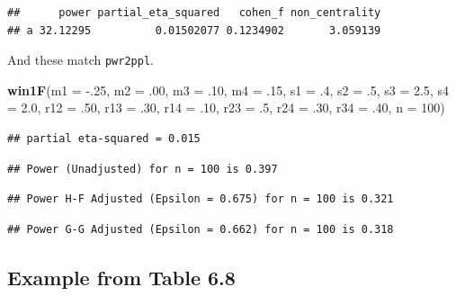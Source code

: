 \documentclass[
]{book}
\newenvironment{Shaded}{\begin{snugshade}}{\end{snugshade}}
\newcommand{\DataTypeTok}[1]{\textcolor[rgb]{0.13,0.29,0.53}{#1}}
\newcommand{\DecValTok}[1]{\textcolor[rgb]{0.00,0.00,0.81}{#1}}
\newcommand{\FloatTok}[1]{\textcolor[rgb]{0.00,0.00,0.81}{#1}}
\newcommand{\KeywordTok}[1]{\textcolor[rgb]{0.13,0.29,0.53}{\textbf{#1}}}
\newcommand{\NormalTok}[1]{#1}
\begin{document}
\begin{verbatim}
##      power partial_eta_squared   cohen_f non_centrality
## a 32.12295          0.01502077 0.1234902       3.059139
\end{verbatim}

And these match \texttt{pwr2ppl}.

\begin{Shaded}
\begin{Highlighting}[]
\KeywordTok{win1F}\NormalTok{(}\DataTypeTok{m1 =} \FloatTok{-.25}\NormalTok{, }\DataTypeTok{m2 =} \FloatTok{.00}\NormalTok{, }\DataTypeTok{m3 =} \FloatTok{.10}\NormalTok{, }\DataTypeTok{m4 =} \FloatTok{.15}\NormalTok{,}
      \DataTypeTok{s1 =} \FloatTok{.4}\NormalTok{, }\DataTypeTok{s2 =} \FloatTok{.5}\NormalTok{, }\DataTypeTok{s3 =} \FloatTok{2.5}\NormalTok{, }\DataTypeTok{s4 =} \FloatTok{2.0}\NormalTok{,}
      \DataTypeTok{r12 =} \FloatTok{.50}\NormalTok{, }\DataTypeTok{r13 =} \FloatTok{.30}\NormalTok{, }\DataTypeTok{r14 =} \FloatTok{.10}\NormalTok{,}
      \DataTypeTok{r23 =} \FloatTok{.5}\NormalTok{, }\DataTypeTok{r24 =} \FloatTok{.30}\NormalTok{, }\DataTypeTok{r34 =} \FloatTok{.40}\NormalTok{,}
      \DataTypeTok{n =} \DecValTok{100}\NormalTok{)}
\end{Highlighting}
\end{Shaded}

\begin{verbatim}
## partial eta-squared = 0.015
\end{verbatim}

\begin{verbatim}
## Power (Unadjusted) for n = 100 is 0.397
\end{verbatim}

\begin{verbatim}
## Power H-F Adjusted (Epsilon = 0.675) for n = 100 is 0.321
\end{verbatim}

\begin{verbatim}
## Power G-G Adjusted (Epsilon = 0.662) for n = 100 is 0.318
\end{verbatim}

\hypertarget{example-from-table-6.8}{%
\subsection{Example from Table 6.8}\label{example-from-table-6.8}}
\end{document}
